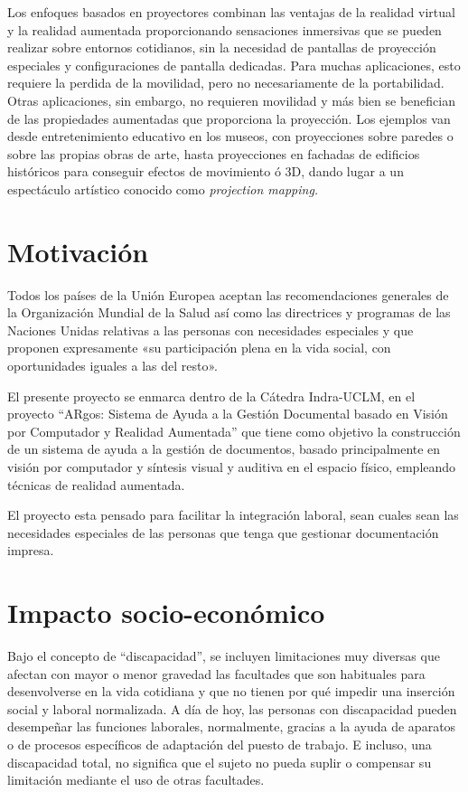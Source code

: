 
Los enfoques basados en proyectores combinan las ventajas de la realidad virtual y la realidad aumentada proporcionando sensaciones inmersivas que se pueden realizar sobre entornos cotidianos, sin la necesidad de pantallas de proyección especiales y configuraciones de pantalla dedicadas. Para muchas aplicaciones, esto requiere la perdida de la movilidad, pero no necesariamente de la portabilidad. Otras aplicaciones, sin embargo, no requieren movilidad y más bien se benefician de las propiedades aumentadas que proporciona la proyección. Los ejemplos van desde entretenimiento educativo en los museos, con proyecciones sobre paredes o sobre las propias obras de arte, hasta proyecciones en fachadas de edificios históricos para conseguir efectos de movimiento ó 3D, dando lugar a un espectáculo artístico conocido como \emph{projection mapping.}

\section{Motivación}
Todos los países de la Unión Europea aceptan las recomendaciones generales de la Organización Mundial de la Salud así como las directrices y programas de las Naciones Unidas relativas a las personas con necesidades especiales y que proponen expresamente «su participación plena en la vida social, con oportunidades iguales a las del resto». 
 
El presente proyecto se enmarca dentro de la Cátedra Indra-UCLM, en el proyecto “ARgos: Sistema de Ayuda a la Gestión Documental basado en Visión por Computador y Realidad Aumentada” que tiene como objetivo la construcción de un sistema de ayuda a la gestión de documentos, basado principalmente en visión por computador y síntesis visual y auditiva en el espacio físico, empleando técnicas de realidad aumentada. 

El proyecto esta pensado para facilitar la integración laboral, sean cuales sean las necesidades especiales de las personas que tenga que gestionar documentación impresa. 
  
\section{Impacto socio-económico}
Bajo el concepto de ``discapacidad'', se incluyen limitaciones muy diversas que afectan con mayor o menor gravedad las facultades que son habituales para desenvolverse en la vida cotidiana y que no tienen por qué impedir una inserción social y laboral normalizada. A día de hoy, las personas con discapacidad pueden desempeñar las funciones laborales, normalmente, gracias a la ayuda de aparatos o de procesos específicos de adaptación del puesto de trabajo. E incluso, una discapacidad total, no significa que el sujeto no pueda suplir o compensar su limitación mediante el uso de otras facultades. 

